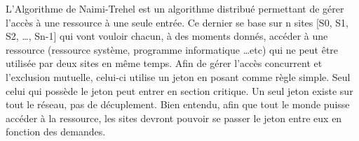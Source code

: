 L’Algorithme de Naimi-Trehel est un algorithme distribué permettant de gérer l’accès à une ressource à une seule entrée.
Ce dernier se base sur n sites [S0, S1, S2, …, Sn-1] qui vont vouloir chacun, à des moments donnés, accéder à une ressource (ressource système, programme informatique \dots etc) qui ne peut être utilisée par deux sites en même temps.
Afin de gérer l’accès concurrent et l’exclusion mutuelle, celui-ci utilise un jeton en posant comme règle simple.
Seul celui qui possède le jeton peut entrer en section critique.
Un seul jeton existe sur tout le réseau, pas de décuplement.
Bien entendu, afin que tout le monde puisse accéder à la ressource, les sites devront pouvoir se passer le jeton entre eux en fonction des demandes.